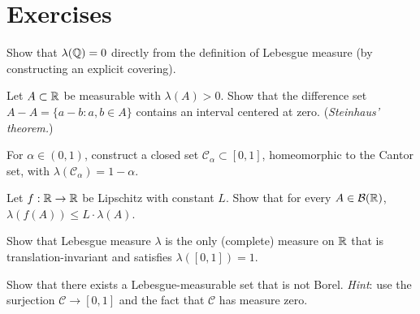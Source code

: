 \section{Exercises}

\begin{exercise}
Show that $\lambda(\mathbb{Q}) = 0$ directly from the definition of Lebesgue measure (by
constructing an explicit covering).
\end{exercise}

\begin{exercise}
Let $A \subset \mathbb{R}$ be measurable with $\lambda(A) > 0$. Show that the difference
set $A - A = \{a - b : a, b \in A\}$ contains an interval centered at zero.
(\emph{Steinhaus' theorem.})
\end{exercise}

\begin{exercise}
For $\alpha \in (0, 1)$, construct a closed set $\mathcal{C}_\alpha \subset [0, 1]$,
homeomorphic to the Cantor set, with $\lambda(\mathcal{C}_\alpha) = 1 - \alpha$.
\end{exercise}

\begin{exercise}
Let $f : \mathbb{R} \to \mathbb{R}$ be Lipschitz with constant $L$. Show that for every
$A \in \mathcal{B}(\mathbb{R})$, $\lambda(f(A)) \leq L \cdot \lambda(A)$.
\end{exercise}

\begin{exercise}
Show that Lebesgue measure $\lambda$ is the only (complete) measure on $\mathbb{R}$ that is
translation-invariant and satisfies $\lambda([0,1]) = 1$.
\end{exercise}

\begin{exercise}
Show that there exists a Lebesgue-measurable set that is not Borel.
\emph{Hint}: use the surjection $\mathcal{C} \to [0,1]$ and the fact that
$\mathcal{C}$ has measure zero.
\end{exercise}
